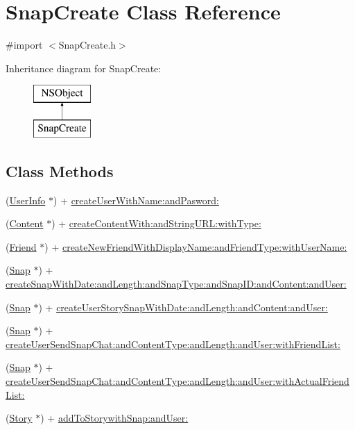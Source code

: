 \hypertarget{interface_snap_create}{}\section{Snap\+Create Class Reference}
\label{interface_snap_create}


{\ttfamily \#import $<$Snap\+Create.\+h$>$}

Inheritance diagram for Snap\+Create\+:\begin{figure}[H]
\begin{center}
\leavevmode
\includegraphics[height=2.000000cm]{interface_snap_create}
\end{center}
\end{figure}
\subsection*{Class Methods}
\begin{DoxyCompactItemize}
\item 
(\hyperlink{interface_user_info}{User\+Info} $\ast$) + \hyperlink{interface_snap_create_a43294c2a2a9227453be82d6988f8ae79}{create\+User\+With\+Name\+:and\+Pasword\+:}
\item 
(\hyperlink{interface_content}{Content} $\ast$) + \hyperlink{interface_snap_create_a5d32474fa42fb8880d049bdbeb643653}{create\+Content\+With\+:and\+String\+U\+R\+L\+:with\+Type\+:}
\item 
(\hyperlink{interface_friend}{Friend} $\ast$) + \hyperlink{interface_snap_create_aa922b646f4928ffab8f9287781aeac2c}{create\+New\+Friend\+With\+Display\+Name\+:and\+Friend\+Type\+:with\+User\+Name\+:}
\item 
(\hyperlink{interface_snap}{Snap} $\ast$) + \hyperlink{interface_snap_create_a2d6a6bced913823c8a36496f8522a746}{create\+Snap\+With\+Date\+:and\+Length\+:and\+Snap\+Type\+:and\+Snap\+I\+D\+:and\+Content\+:and\+User\+:}
\item 
(\hyperlink{interface_snap}{Snap} $\ast$) + \hyperlink{interface_snap_create_a4091b6c8ec21168582dff07bd4345541}{create\+User\+Story\+Snap\+With\+Date\+:and\+Length\+:and\+Content\+:and\+User\+:}
\item 
(\hyperlink{interface_snap}{Snap} $\ast$) + \hyperlink{interface_snap_create_abb466be3a3477a82cb7ea378aa5cd1a4}{create\+User\+Send\+Snap\+Chat\+:and\+Content\+Type\+:and\+Length\+:and\+User\+:with\+Friend\+List\+:}
\item 
(\hyperlink{interface_snap}{Snap} $\ast$) + \hyperlink{interface_snap_create_a88b8d1152d7b8685139622008193a5ed}{create\+User\+Send\+Snap\+Chat\+:and\+Content\+Type\+:and\+Length\+:and\+User\+:with\+Actual\+Friend\+List\+:}
\item 
(\hyperlink{interface_story}{Story} $\ast$) + \hyperlink{interface_snap_create_a47a5a18c5a8aff573bb35f3f3513a039}{add\+To\+Storywith\+Snap\+:and\+User\+:}
\end{DoxyCompactItemize}



